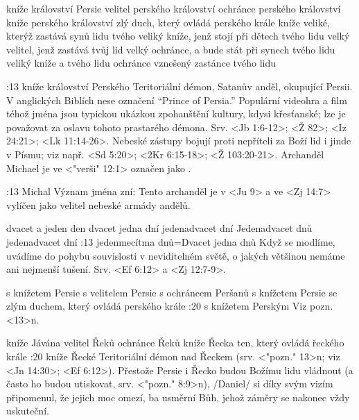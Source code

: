     {kníže království Persie}   %
    {velitel perského království}   %
    {ochránce perského království}   %
    {kníže perského království}   %
    {zlý duch, který ovládá perského krále}   %
\vdef   
    {kníže veliké, kterýž zastává synů lidu tvého}   %
    {veliký kníže, jenž stojí při dětech tvého lidu}   %
    {velký velitel, jenž zastává tvůj lid}   %
    {velký ochránce, a bude stát při synech tvého lidu}   %
    {veliký kníže a tvého lidu ochránce}   %
    {vznešený zastánce tvého lidu}   %
    
:13 {kníže království Perského} Teritoriální démon, Satanův anděl, okupující Persii. V anglických Biblích nese označení ``Prince of Persia.'' Populární videohra a film téhož jména jsou typickou ukázkou zpohanštění kultury, kdysi křesťanské; lze je považovat za oslavu tohoto prastarého démona.
Srv. <Jb 1:6-12>; <Ž 82>; <Iz 24:21>; <Lk 11:14-26>. Nebeské zástupy bojují proti nepříteli za Boží lid  i jinde v Písmu; viz např. <Sd 5:20>;  <2Kr 6:15-18>;  <Ž 103:20-21>. Archanděl Michael je ve  <"verši" 12:1> označen jako  .


:13 {Michal} Význam jména zní:  Tento archanděl je v <Ju 9> a ve <Zj 14:7>   vylíčen jako velitel nebeské armády andělů. 

    {dvacet a jeden den} %
    {dvacet jedna dní}   %
    {jedenadvacet dní}   %
    {Jedenadvacet dnů}   %
    {jedenadvacet dní}   %
:13 {jedenmecítma dnů}={Dvacet jedna dnů} Když se modlíme, uvádíme do pohybu souvislosti v neviditelném světě, o jakých většinou nemáme ani nejmenší tušení. Srv. <Ef 6:12> a <Zj 12:7-9>.

    {s knížetem Persie}   %
    {s velitelem Persie}   %
    {s ochráncem Peršanů}   %
    {s knížetem Persie}   %
    {se zlým duchem, který ovládá perského krále}   %
:20 {s knížetem Perským} Viz pozn. <13>n.

    {kníže Jávána}   %
    {velitel Řeků}   %
    {ochránce Řeků}   %
    {kníže Řecka}   %
    {ten, který ovládá řeckého krále}   %
:20 {kníže Řecké} Teritoriální démon nad Řeckem (srv. <"pozn." 13>n; viz <Jn 14:30>; <Ef 6:12>). Přestože Persie i Řecko budou Božímu lidu vládnout (a často ho budou utiskovat, srv. <"pozn." 8:9>n),  \x/Daniel/ si díky svým vizím připomenul, že jejich moc  omezí, ba usměrní Bůh, jehož záměry se nakonec vždy uskuteční.

